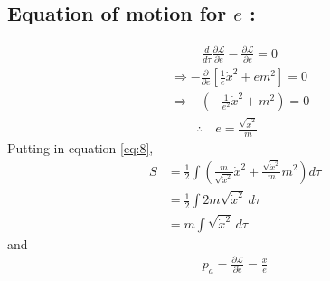 \documentclass[14pt]{article} %
\begin{document}
\subsection*{Equation of motion for $e$ :}
\vspace{-1cm}
\begin{align*}
    & \quad\quad~~\frac{d}{d\tau} \frac{\partial \mathcal{L}}{\partial \dot{e}} - \frac{\partial \mathcal{L}}{\partial e} = 0 \\
    & \Rightarrow -\frac{\partial}{\partial e} \left[ \frac{1}{e} \dot{x}^2 + e m^2 \right] = 0 \\
    & \Rightarrow -\left( -\frac{1}{e^2} \dot{x}^2 + m^2 \right) = 0 \\
    & \quad\quad\therefore \quad e = \frac{\sqrt{\dot{x}^2}}{m}
\quad \tag{9} \label{eq:9}
\end{align*}
Putting in equation \eqref{eq:8},
\begin{align*}
    S &= \frac{1}{2} \int \left( \frac{m}{\sqrt{\dot{x}^2}} \dot{x}^2 + \frac{\sqrt{\dot{x}^2}}{m} m^2 \right) d\tau \\
    &= \frac{1}{2} \int 2m \sqrt{\dot{x}^2} \, d\tau \\
    &= m \int \sqrt{\dot{x}^2} \, d\tau \tag{10} \label{eq:10}
\end{align*}
and
\begin{align*}
p_a = \frac{\partial \mathcal{L}}{\partial \dot{e}} = \frac{\dot{x}}{e} \tag{11}
\label{eq:11}
\end{align*}
\end{document}
